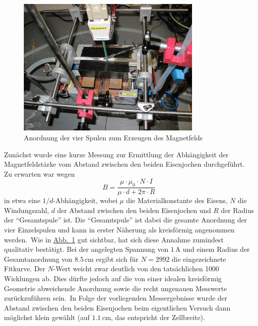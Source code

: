 \documentclass[11pt]{scrartcl}
\newcommand{\unit}[1]{\ensuremath{\,\mathrm{#1}}} %
\newcommand{\abb}[1]{\hyperref[#1]{Abb.~\ref{#1}}}
\begin{document}
\begin{figure}[ht]
\begin{center}
\includegraphics[width=0.8\textwidth]{images/bfeld-vor2.jpg}
\end{center}
\vspace{-1.5\baselineskip}
\caption{Anordnung der vier Spulen zum Erzeugen des Magnetfelds}
\label{bfeld-vor2}
\end{figure}

Zunächst wurde eine kurze Messung zur Ermittlung der Abhängigkeit der Magnetfeldstärke vom Abstand zwischen den beiden Eisenjochen
durchgeführt. Zu erwarten war wegen 
\begin{equation*}
B = \frac{\mu \cdot \mu_{0} \cdot N \cdot I}{\mu \cdot d + 2 \pi \cdot R}
\end{equation*}
in etwa eine $1/d$-Abhängigkeit, wobei $\mu$ die Materialkonstante des Eisens, $N$ die Windungszahl, $d$ der Abstand zwischen den beiden Eisenjochen und $R$ der Radius der "`Gesamtspule"' ist. Die "`Gesamtspule"' ist dabei die gesamte Anordnung der vier Einzelspulen und kann in erster Näherung als kreisförmig angenommen werden.\
Wie in \abb{bfeld-vor2} gut sichtbar, hat sich diese Annahme zumindest qualitativ bestätigt. Bei der angelegten Spannung von $1 \unit{A}$ und einem Radius der Gesamtanordnung von $8.5 \unit{cm}$ ergibt sich für $N=2992$ die eingezeichnete Fitkurve. Der $N$-Wert weicht zwar deutlich von den tatsächlichen 1000 Wicklungen ab. Dies dürfte jedoch auf die von einer idealen kreisförmig Geometrie abweichende Anordnung sowie die recht ungenauen Messwerte zurückzuführen sein.\ In Folge der vorliegenden Messergebnisse wurde der Abstand zwischen den beiden Eisenjochen beim eigentlichen Versuch dann möglichst klein gewählt (auf $1.1 \unit{cm}$, das entspricht der Zellbreite).
\end{document}
